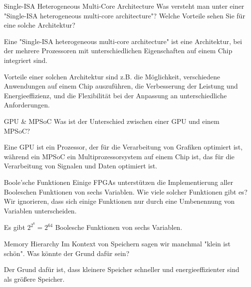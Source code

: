 \documentclass{article}
\begin{document}
\begin{exercise}{Single-ISA Heterogeneous Multi-Core Architecture}
  Was versteht man unter einer "Single-ISA heterogeneous multi-core architecture"? Welche Vorteile sehen Sie für eine solche Architektur?

  \begin{solution}
    Eine "Single-ISA heterogeneous multi-core architecture" ist eine Architektur, bei der mehrere Prozessoren mit unterschiedlichen Eigenschaften auf einem Chip integriert sind.

    Vorteile einer solchen Architektur sind z.B. die Möglichkeit, verschiedene Anwendungen auf einem Chip auszuführen, die Verbesserung der Leistung und Energieeffizienz, und die Flexibilität bei der Anpassung an unterschiedliche Anforderungen.
  \end{solution}
\end{exercise}

\begin{exercise}{GPU \& MPSoC}
  Was ist der Unterschied zwischen einer GPU und einem MPSoC?

  \begin{solution}
    Eine GPU ist ein Prozessor, der für die Verarbeitung von Grafiken optimiert ist, während ein MPSoC ein Multiprozessorsystem auf einem Chip ist, das für die Verarbeitung von Signalen und Daten optimiert ist.
  \end{solution}
\end{exercise}

\begin{exercise}{Boole'sche Funktionen}
  Einige FPGAs unterstützen die Implementierung aller Booleschen Funktionen von sechs Variablen. Wie viele solcher Funktionen gibt es? Wir ignorieren, dass sich einige Funktionen nur durch eine Umbenennung von Variablen unterscheiden.

  \begin{solution}
    Es gibt $2^{2^6} = 2^{64}$ Boolesche Funktionen von sechs Variablen.
  \end{solution}
\end{exercise}

\begin{exercise}{Memory Hierarchy}
  Im Kontext von Speichern sagen wir manchmal "klein ist schön". Was könnte der Grund dafür sein?

  \begin{solution}
    Der Grund dafür ist, dass kleinere Speicher schneller und energieeffizienter sind als größere Speicher.
  \end{solution}
\end{exercise}
\end{document}

